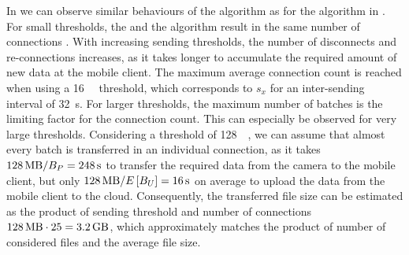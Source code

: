 In  we can observe similar behaviours of the \algosize algorithm as for the \algointerval algorithm in .
For small thresholds, the \algosize and the \algoimmediate algorithm result in the same number of connections \connectionCount .
With increasing sending thresholds, the number of disconnects and re-connections increases, as it takes longer to accumulate the required amount of new data at the mobile client.
The maximum average connection count \connectionCount is reached when using a \SI{16}{\mega\byte} threshold, which corresponds to \(s_x\) for an inter-sending interval of \SI{32}{\second}.
For larger thresholds, the maximum number of batches is the limiting factor for the connection count.
This can especially be observed for very large thresholds.
Considering a threshold of \SI{128}{\mega\byte}, we can assume that almost every batch is transferred in an individual connection, as it takes \(\SI{128}{\mega\byte} / \panTransferRate = \SI{248}{\second}\) to transfer the required data from the camera to the mobile client, but only \(\SI{128}{\mega\byte} / E\left[\uploadbandwidth\right] = \SI{16}{\second}\) on average to upload the data from the mobile client to the cloud.
Consequently, the transferred file size can be estimated as the product of sending threshold and number of connections \(\SI{128}{\mega\byte} \cdot 25 = \SI{3.2}{\giga\byte}\), which approximately matches the product of number of considered files and the average file size.

